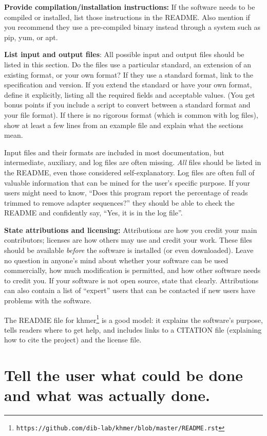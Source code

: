 \documentclass[10pt,letterpaper]{article}
\newcommand{\withurl}[2]{{#1}\footnote{\texttt{#2}}}
\begin{document}
\textbf{Provide compilation/installation instructions:}
If the software needs to be compiled
or installed, list those instructions in the README. Also
mention if you recommend they use a pre-compiled binary instead
through a system such as pip, yum, or apt.

\textbf{List input and output files}: All possible input and output files
should be listed in this section. Do the files use a particular
standard, an extension of an existing format, or your own
format?  If they use a standard format, link to the specification and
version. If you extend the standard or have your own format, define it
explicitly, listing all the required fields and acceptable values.
(You get bonus points if you include a script to convert between
a standard format and your file format). If there is no rigorous format
(which is common with log files), show at least a few lines from an
example file and explain what the sections mean.

Input files and their formats are included in most documentation, but
intermediate, auxiliary, and log files are often missing.
\emph{All} files should be listed in the README, even those considered self-explanatory. Log
files are often full of valuable information that can be
mined for the user's specific purpose. If your users might need to know,
``Does this program report the percentage of reads trimmed to remove
adapter sequences?'' they should be able to check the README and confidently
say, ``Yes, it is in the log file''.

\textbf{State attributions and licensing:} Attributions are how you credit
your main contributors; licenses are how others may use and
credit your work. These files should be available \emph{before}
the software is installed (or even downloaded).
Leave no
question in anyone's mind about whether your software can be used
commercially, how much modification is permitted, and how other software
needs to credit you. If your software is not open source, state that clearly.
Attributions can also contain a list of ``expert'' users
that can be contacted if new users have problems with the software.

The README file for \withurl{khmer}{https://github.com/dib-lab/khmer/blob/master/README.rst}
is a good model:
it explains the software's purpose,
tells readers where to get help,
and includes links to a CITATION file (explaining how to cite the project)
and the license file.

\section{Tell the user what could be done and what was actually done.}
\end{document}
